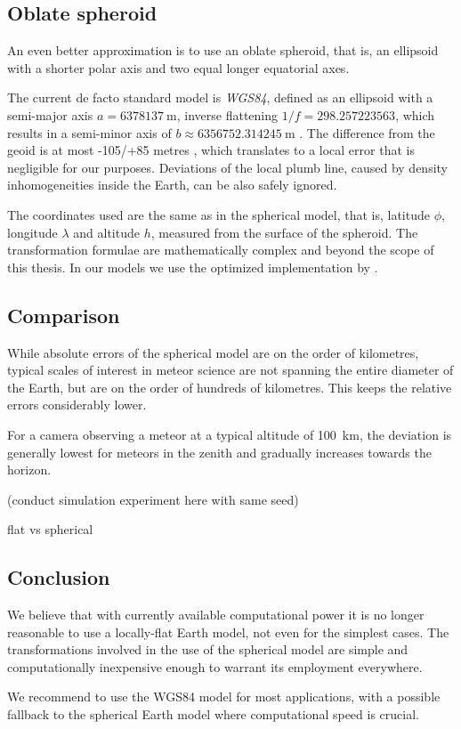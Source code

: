     \subsection{Oblate spheroid} \label{mEo}
        An even better approximation is to use an oblate spheroid,
        that is, an ellipsoid with a shorter polar axis and two
        equal longer equatorial axes.

        The current de facto standard model is \emph{WGS84}, defined as an ellipsoid
        with a semi-major axis $a = \SI{6378137}{\metre}$, inverse flattening
        $1/f = \num{298.257223563}$, which results in a semi-minor axis of
        $b \approx \SI{6356752.314245}{\metre}$ \cite{???}.
        The difference from the geoid is at most -105/+85 metres \cite{???},
        which translates to a local error that is negligible for our purposes.
        Deviations of the local plumb line, caused by density inhomogeneities
        inside the Earth, can be also safely ignored.

        The coordinates used are the same as in the spherical model, that is, latitude $\phi$,
        longitude $\lambda$ and altitude $h$, measured from the surface of the spheroid.
        The transformation formulae are mathematically complex and beyond the scope of this thesis.
        In our models we use the optimized implementation by \citet{osen2017}.

    \subsection{Comparison} \label{mEc}

        While absolute errors of the spherical model are on the order of kilometres,
        typical scales of interest in meteor science are not spanning the entire diameter of the Earth,
        but are on the order of hundreds of kilometres. This keeps the relative errors considerably lower.

        For a camera observing a meteor at a typical altitude of \SI{100}{\kilo\metre},
        the deviation is generally lowest for meteors in the zenith
        and gradually increases towards the horizon.

        (conduct simulation experiment here with same seed)

        flat vs spherical

    \subsection{Conclusion}
        We believe that with currently available computational power it is no longer reasonable to
        use a locally-flat Earth model, not even for the simplest cases.
        The transformations involved in the use of the spherical model
        are simple and computationally inexpensive enough to warrant its employment everywhere.

        We recommend to use the WGS84 model for most applications, with a possible
        fallback to the spherical Earth model where computational speed is crucial.
